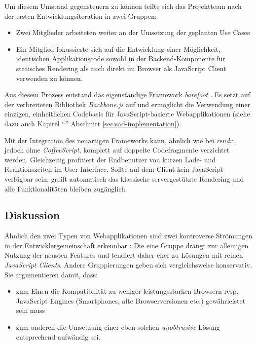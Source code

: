 Um diesem Umstand gegensteuern zu können teilte sich das Projektteam nach der ersten Entwicklungsiteration in zwei Gruppen:

\begin{itemize}
	\item Zwei Mitglieder arbeiteten weiter an der Umsetzung der geplanten Use Cases
	\item Ein Mitglied fokussierte sich auf die Entwicklung einer Möglichkeit, identischen Applikationscode sowohl in der Backend-Komponente für statisches Rendering als auch direkt im Browser als JavaScript Client verwenden zu können.
\end{itemize}

Aus diesem Prozess entstand das eigenständige Framework \emph{barefoot} \cite{Barefoot}. Es setzt auf der verbreiteten Bibliothek \emph{Backbone.js} \cite{Backbonejs} auf und ermöglicht die Verwendung einer einzigen, einheitlichen Codebasis für JavaScript-basierte Webapplikationen (siehe dazu auch Kapitel ``'' Abschnitt \ref{sec:sad-implementation}).

Mit der Integration des neuartigen Frameworks kann, ähnlich wie bei \emph{rendr} \cite{rendr}, jedoch ohne \emph{CoffeeScript}, komplett auf doppelte Codefragmente verzichtet werden. Gleichzeitig profitiert der Endbenutzer von kurzen Lade- und Reaktionszeiten im User Interface. Sollte auf dem Client kein JavaScript verfügbar sein, greift automatisch das klassische servergestützte Rendering und alle Funktionalitäten bleiben zugänglich.

\subsection*{Diskussion}

Ähnlich den zwei Typen von Webapplikationen sind zwei kontroverse Strömungen in der Entwicklergemeinschaft erkennbar \cite{StackOverflowUnobtrusiveJavascriptOutdated}: Die eine Gruppe drängt zur alleinigen Nutzung der neusten Features und tendiert daher eher zu Lösungen mit reinen \emph{JavaScript Clients}. Andere Gruppierungen geben sich vergleichsweise konservativ. Sie argumentieren damit, dass:

\begin{itemize}
	\item zum Einen die Kompatibilität zu weniger leistungsstarken Browsern resp. JavaScript Engines (Smartphones, alte Browserversionen etc.) gewährleistet sein muss
	\item zum anderen die Umsetzung einer eben solchen \emph{unobtrusive} Lösung entsprechend aufwändig sei.
\end{itemize}

